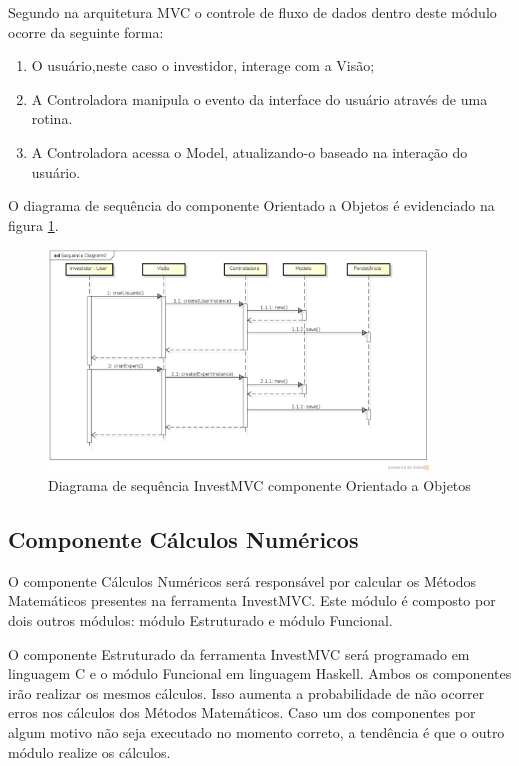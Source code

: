 Segundo  na arquitetura MVC o controle de fluxo de dados dentro deste módulo ocorre da seguinte forma:

\begin{enumerate}
\item O usuário,neste caso o investidor, interage com a Visão;
\item A Controladora manipula o evento da interface do usuário através de uma rotina.
\item A Controladora acessa o Model, atualizando-o baseado na interação do usuário.
\end{enumerate}

O diagrama de sequência do componente Orientado a Objetos é evidenciado na figura \ref{sequenciaOO}.

\begin{figure}[H]
\centering
\includegraphics[width=0.9\textwidth]{figuras/sequenciaOO}
\caption{Diagrama de sequência InvestMVC componente Orientado a Objetos}
\label{sequenciaOO}
\end{figure}

\subsection{Componente Cálculos Numéricos}

O componente Cálculos Numéricos será responsável por calcular os Métodos Matemáticos presentes na ferramenta InvestMVC. Este módulo é composto por dois outros módulos: módulo Estruturado e módulo Funcional.

O componente Estruturado da ferramenta InvestMVC será programado em linguagem C e o módulo Funcional em linguagem Haskell. Ambos os componentes irão realizar os mesmos cálculos. Isso aumenta a probabilidade de não ocorrer erros nos cálculos dos Métodos Matemáticos. Caso um dos componentes por algum motivo não seja executado no momento correto, a tendência é que o outro módulo realize os cálculos.

